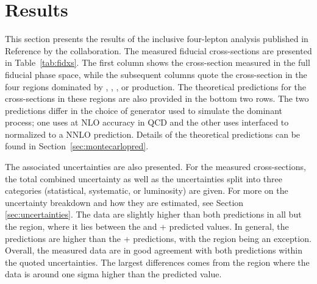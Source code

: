 \section{Results}
\label{sec:m4lresults}
This section presents the results of the inclusive four-lepton analysis published in Reference \cite{m4l2021_paper} by the \ATLAS collaboration. The measured fiducial cross-sections are presented in Table~\ref{tab:fidxs}. The first column shows the cross-section measured in the full fiducial phase space, while the subsequent columns quote the cross-section in the four \mFourL{} regions dominated by \ZFourL{}, \HFourL{}, \onshellZZ{}, or \offshellZZ{} production. The theoretical predictions for the cross-sections in these regions are also provided in the bottom two rows. The two predictions differ in the choice of generator used to simulate the dominant \qqFourL{} process; one uses \SHERPA at NLO accuracy in QCD and the other uses \POWHEG interfaced to \pythia{} normalized to a NNLO prediction. Details of the theoretical predictions can be found in Section~\ref{sec:montecarlopred}.

The associated uncertainties are also presented. For the measured cross-sections, the total combined uncertainty as well as the uncertainties split into three categories (statistical, systematic, or luminosity) are given. For more on the uncertainty breakdown and how they are estimated, see Section \ref{sec:uncertainties}. The data are slightly higher than both predictions in all but the \ZFourL{} region, where it lies between the \SHERPA{} and \POWHEG{} + \pythia{} predicted values. In general, the \SHERPA{} predictions are higher than the \POWHEG{} + \pythia{} predictions, with the \onshellZZ{} region being an exception. Overall, the measured data are in good agreement with both predictions within the quoted uncertainties. The largest differences comes from the \onshellZZ{} region where the data is around one sigma higher than the predicted \SHERPA{} value. 

